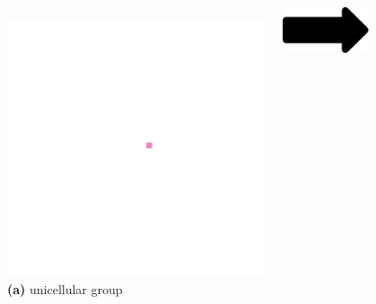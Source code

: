 \begin{figure}
  \centering
\begin{columns}
\begin{column}{0.20\textwidth}
  \centering
    \includegraphics[width=\textwidth,trim={300 300 250 300},clip]{img/lifecycle-1}\\
    \footnotesize \textbf{(a)} unicellular group
\end{column}
\begin{column}{0.05\textwidth}
  \vspace{3ex}
  \includegraphics[width=\textwidth]{img/arrow}
\end{column}
\begin{column}{0.20\textwidth}

\end{column}
\end{columns}
\end{figure}
